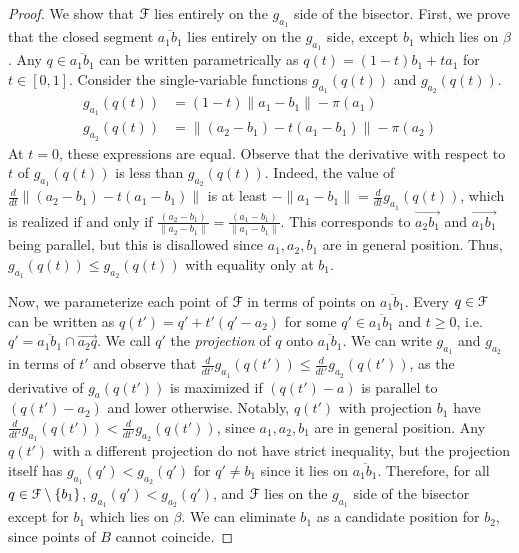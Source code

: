 \documentclass[a4paper,UKenglish]{socg-lipics-v2018}
\def\norm#1{\mathopen\| #1 \mathclose\|}	%
\theoremstyle{plain}
\numberwithin{figure}{section}
\def\EMPH#1{\textcolor{BrickRed}{{\emph{#1}}}}
\begin{document}
\begin{toappendix}
\begin{proof}
We show that $\EuScript{F}$ lies entirely on the $g_{a_1}$ side of the
bisector.
First, we prove that the closed segment $\overline{a_1 b_1}$ lies entirely on
the $g_{a_1}$ side, except $b_1$ which lies on $\beta$.
Any $q \in \overline{a_1 b_1}$ can be written parametrically as
$q(t) = (1-t) b_1 + t a_1$ for $t \in [0,1]$.
Consider the single-variable functions $g_{a_1}(q(t))$ and $g_{a_2}(q(t))$.
\begin{equation*}
\begin{aligned}
	g_{a_1}(q(t)) &= (1-t)\norm{a_1 - b_1} - \pi(a_1) \\
	g_{a_2}(q(t)) &= \norm{(a_2 - b_1) - t(a_1 - b_1)} - \pi(a_2)
\end{aligned}
\end{equation*}
At $t=0$, these expressions are equal.
Observe that the derivative with respect to $t$ of $g_{a_1}(q(t))$ is less than
$g_{a_2}(q(t))$.
Indeed, the value of $\frac{d}{dt}\norm{(a_2 - b_1) - t(a_1 - b_1)}$ is at
least $-\norm{a_1 - b_1} = \frac{d}{dt}g_{a_1}(q(t))$, which is realized if and only if
$\frac{(a_2 - b_1)}{\norm{a_2 - b_1}} = \frac{(a_1 - b_1)}{\norm{a_1 - b_1}}$.
This corresponds to $\overrightarrow{a_2 b_1}$ and $\overrightarrow{a_1 b_1}$
being parallel, but this is disallowed since $a_1, a_2, b_1$ are in general
position.
Thus, $g_{a_1}(q(t)) \leq g_{a_2}(q(t))$ with equality only at $b_1$.

Now, we parameterize each point of $\EuScript{F}$ in terms of points on
$\overline{a_1 b_1}$.
Every $q \in \EuScript{F}$ can be written as $q(t') = q' + t'(q' - a_2)$ for
some $q' \in \overline{a_1 b_1}$ and $t \geq 0$, i.e.
$q' = \overline{a_1 b_1} \cap \overrightarrow{a_2 q}$.
We call $q'$ the \EMPH{projection} of $q$ onto $\overline{a_1 b_1}$.
We can write $g_{a_1}$ and $g_{a_2}$ in terms of $t'$ and observe that
$\frac{d}{dt'}g_{a_1}(q(t')) \leq \frac{d}{dt'}g_{a_2}(q(t'))$, as the
derivative of $g_a(q(t'))$ is maximized if $(q(t') - a)$ is parallel to
$(q(t') - a_2)$ and lower otherwise.
Notably, $q(t')$ with projection $b_1$ have
$\frac{d}{dt'}g_{a_1}(q(t')) < \frac{d}{dt'}g_{a_2}(q(t'))$, since
$a_1, a_2, b_1$ are in general position.
Any $q(t')$ with a different projection do not have strict inequality, but
the projection itself has $g_{a_1}(q') < g_{a_2}(q')$ for $q' \neq b_1$ since
it lies on $\overline{a_1 b_1}$.
Therefore, for all $q \in \EuScript{F} \setminus \{b_1\}$,
$g_{a_1}(q') < g_{a_2}(q')$, and $\EuScript{F}$ lies on the $g_{a_1}$ side of
the bisector except for $b_1$ which lies on $\beta$.
We can eliminate $b_1$ as a candidate position for $b_2$, since points of $B$
cannot coincide.


\end{proof}
\end{toappendix}
\end{document}
